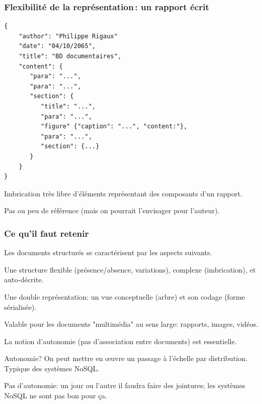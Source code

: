 \begin{frame}[fragile]
\frametitle{Flexibilité de la représentation\,: un rapport écrit}

\begin{verbatim}
{
    "author": "Philippe Rigaux"
    "date": "04/10/2065",
    "title": "BD documentaires",
    "content": {
       "para": "...",
       "para": "...",
       "section": {
          "title": "...",
          "para": "...",
          "figure" {"caption": "...", "content:"},
          "para": "...",
          "section": {...}
       }
    }
}
\end{verbatim}

\begin{redbullet}
  \item Imbrication très libre d'éléments représentant des composants d'un rapport.
  \item Pas ou peu de \alert{référence} (mais on pourrait l'envisager pour l'auteur).
\end{redbullet}
\end{frame}




\begin{frame}[fragile]
\frametitle{Ce qu'il faut retenir}

Les documents structurés se caractérisent par les aspects suivants.

\begin{redbullet}
  \item Une structure \alert{flexible} (présence/absence, variations), \alert{complexe} (imbrication),
   et \alert{auto-décrite}.
  \item Une double représentation: un vue conceptuelle (arbre) et son codage (forme sérialisée).
    \item \alert{Valable} pour les documents "multimédia" au sens large: rapports, images, vidéos.
 \end{redbullet}
 
\vfill
La notion d'autonomie (pas d'association entre documents) est essentielle.
\begin{redbullet}
       \item Autonomie? On peut mettre en {\oe}uvre un \alert{passage à l'échelle par
       distribution}. Typique des systèmes NoSQL.
       \item Pas d'autonomie: un jour ou l'autre il faudra faire des jointures; 
          les systèmes NoSQL ne sont pas bon pour ça.
 \end{redbullet}

\end{frame}

